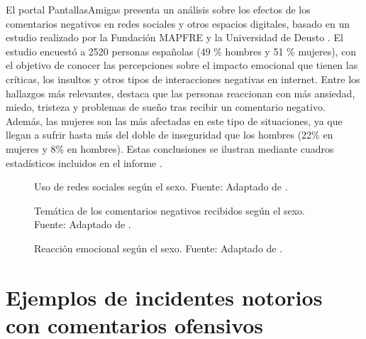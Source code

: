 El portal PantallasAmigas presenta un análisis sobre los efectos de los comentarios negativos en redes sociales y otros espacios digitales, basado en un estudio realizado por la Fundación MAPFRE y la Universidad de Deusto \cite{mapfre2023redes}. El estudio encuestó a 2520 personas españolas (49 \% hombres y 51 \% mujeres), con el objetivo de conocer las percepciones sobre el impacto emocional que tienen las críticas, los insultos y otros tipos de interacciones negativas en internet. Entre los hallazgos más relevantes, destaca que las personas reaccionan con más ansiedad, miedo, tristeza y problemas de sueño tras recibir un comentario negativo. Además, las mujeres son las más afectadas en este tipo de situaciones, ya que llegan a sufrir hasta más del doble de inseguridad que los hombres (22\% en mujeres y 8\% en hombres). Estas conclusiones se ilustran mediante cuadros estadísticos incluidos en el informe \cite{pantallasamigas2024comentarios}.








\vspace{0.5cm}

\begin{figure}[h!]
    \centering
    \caption{Uso de redes sociales según el sexo. Fuente: Adaptado de \cite{mapfre2023redes}.}
\end{figure}

\begin{figure}[h!]
    \centering
    \caption{Temática de los comentarios negativos recibidos según el sexo. Fuente: Adaptado de \cite{mapfre2023redes}.}
\end{figure}














\vspace{0.5cm}

\begin{figure}[h!]
    \centering
    \caption{Reacción emocional según el sexo. Fuente: Adaptado de \cite{mapfre2023redes}.}
\end{figure}

\section{Ejemplos de incidentes notorios con comentarios ofensivos}

